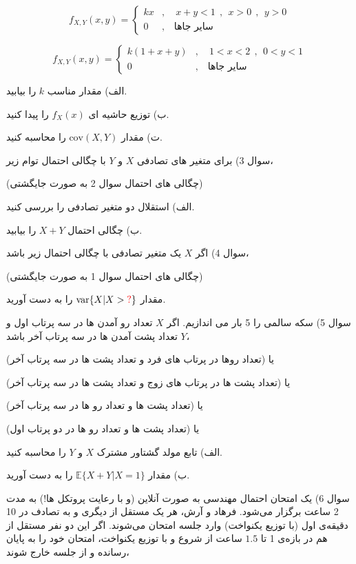 \documentclass{article}
\newcommand{\red}[1]{{\color{red}#1}}
\begin{document}
$$
f_{X,Y}(x,y)=\begin{cases}
kx&,\quad x+y<1 \ \ ,\ \ x>0 \ \ , \ \ y>0\\
0&,\quad \text{سایر جاها}
\end{cases}
$$

$$
f_{X,Y}(x,y)=\begin{cases}
k(1+x+y)&,\quad 1<x<2\ \ , \ \ 0<y<1\\
0&,\quad \text{سایر جاها}
\end{cases}
$$

الف) مقدار مناسب $k$ را بیابید.

ب) توزیع حاشیه ای 
$
f_X(x)
$
را پیدا کنید.

ت) مقدار 
$
\text{cov}(X,Y)
$
را محاسبه کنید.



\newpage
سوال 3) برای متغیر های تصادفی $X$ و $Y$ با چگالی احتمال توام زیر،

\red{
(چگالی های احتمال سوال 2 به صورت جایگشتی)
}

الف) استقلال دو متغیر تصادفی را بررسی کنید.

ب) چگالی احتمال $X+Y$ را بیابید.

\newpage
سوال 4) اگر $X$ یک متغیر تصادفی با چگالی احتمال زیر باشد،

\red{
(چگالی های احتمال سوال 1 به صورت جایگشتی)
}

مقدار 
$
\text{var}\{X|X>\red{?}\}
$
را به دست آورید.

\newpage
سوال 5) سکه سالمی را 5 بار می اندازیم. اگر $X$ تعداد رو آمدن ها در سه پرتاب اول و $Y$ تعداد پشت آمدن ها در سه پرتاب آخر باشد،

یا (تعداد روها در پرتاب های فرد و تعداد پشت ها در سه پرتاب آخر)

یا (تعداد پشت ها در پرتاب های زوج و تعداد پشت ها در سه پرتاب آخر)

یا (تعداد پشت ها و تعداد رو ها در سه پرتاب آخر)

یا (تعداد پشت ها و تعداد رو ها در دو پرتاب اول)

الف) تابع مولد گشتاور مشترک $X$ و $Y$ را محاسبه کنید.

ب) مقدار 
$
\mathbb{E}\{X+Y|X=1\}
$
را به دست آورید.


\newpage
سوال 6) یک امتحان احتمال مهندسی به صورت آنلاین (و با رعایت پروتکل ها!) به مدت 2 ساعت برگزار می‌شود. فرهاد و آرش، هر یک مستقل از دیگری و به تصادف در 10 دقیقه‌ی اول (با توزیع یکنواخت) وارد جلسه امتحان می‌شوند. اگر این دو نفر مستقل از هم در بازه‌ی 1 تا $1.5$ ساعت از شروع و با توزیع یکنواخت، امتحان خود را به پایان رسانده و از جلسه خارج شوند،
\end{document}
